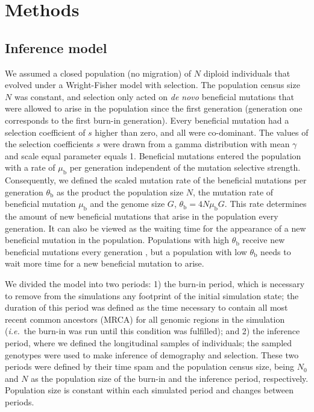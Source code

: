 \documentclass[a4paper, 12pt]{article}
\begin{document}
\section*{Methods}

\subsection*{Inference model}

We assumed a closed population (no migration) of $N$ diploid individuals that evolved under a Wright-Fisher model with selection. The population census size $N$ was constant, and selection only acted on \textit{de novo} beneficial mutations that were allowed to arise in the population since the first generation (generation one corresponds to the first burn-in generation). Every beneficial mutation had a selection coefficient of $s$ higher than zero, and all were co-dominant. The values of the selection coefficients $s$ were drawn from a gamma distribution with mean $\gamma$ and scale equal parameter equals 1. Beneficial mutations entered the population with a rate of $\mu_\mathrm{b}$ per generation independent of the mutation selective strength. Consequently, we defined the scaled mutation rate of the beneficial mutations per generation $\theta_\mathrm{b}$ as the product the population size $N$, the mutation rate of beneficial mutation $\mu_\mathrm{b}$ and the genome size $G$, $\theta_\mathrm{b} = 4N\mu_\mathrm{b}G$. This rate determines the amount of new beneficial mutations that arise in the population every generation. It can also be viewed as the waiting time for the appearance of a new beneficial mutation in the population. Populations with high $\theta_\mathrm{b}$ receive new beneficial mutations every generation \citep{Karasov:2010di}, but a population with low $\theta_\mathrm{b}$ needs to wait more time for a new beneficial mutation to arise.

We divided the model into two periods: 1) the burn-in period, which is necessary to remove from the simulations any footprint of the initial simulation state; the duration of this period was defined as the time necessary to contain all most recent common ancestors (MRCA) for all genomic regions in the simulation (\textit{i.e.}\ the burn-in was run until this condition was fulfilled); and 2) the inference period, where we defined the longitudinal samples of individuals; the sampled genotypes were used to make inference of demography and selection. These two periods were defined by their time spam and the population census size, being $N_\mathrm{0}$ and $N$ as the population size of the burn-in and the inference period, respectively. Population size is constant within each simulated period and changes between periods.
\end{document}

